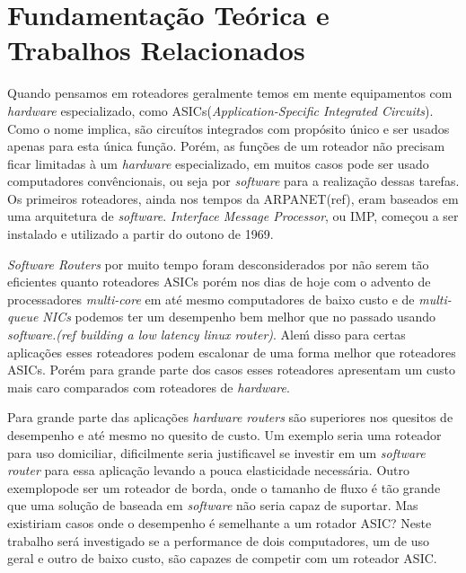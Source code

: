 \section{Fundamentação Teórica e Trabalhos Relacionados}
Quando pensamos em roteadores geralmente temos em mente equipamentos com \textit{hardware} especializado, como ASICs(\textit{Application-Specific Integrated Circuits}). Como o nome implica, são circuítos integrados com propósito único e ser usados apenas para esta única função. Porém, as funções de um roteador não precisam ficar limitadas à um \textit{hardware} especializado, em muitos casos pode ser usado computadores convêncionais, ou seja por \textit{software} para a realização dessas tarefas. 
Os primeiros roteadores, ainda nos tempos da ARPANET(ref), eram baseados em uma arquitetura de \textit{software}. \textit{Interface Message Processor}, ou IMP, começou a ser instalado e utilizado a partir do outono de 1969.%

\textit{Software Routers} por muito tempo foram desconsiderados por não serem tão eficientes quanto roteadores ASICs porém nos dias de hoje com o advento de processadores \textit{multi-core} em até mesmo computadores de baixo custo e de \textit{multi-queue NICs} podemos ter um desempenho bem melhor que no passado usando \textit{software.(ref building a low latency linux router)}. Aleḿ disso para certas aplicações esses roteadores podem escalonar de uma forma melhor que roteadores ASICs. Porém para grande parte dos casos esses roteadores apresentam um custo mais caro comparados com roteadores de \textit{hardware}.

Para grande parte das aplicações \textit{hardware routers} são superiores nos quesitos de desempenho e até mesmo no quesito de custo. Um exemplo seria uma roteador para uso domiciliar, dificilmente seria justificavel se investir em um \textit{software router} para essa aplicação levando a pouca elasticidade necessária. Outro exemplopode ser um roteador de borda, onde o tamanho de fluxo é tão grande que uma solução de baseada em \textit{software} não seria capaz de suportar. Mas existiriam casos onde o desempenho é semelhante a um rotador ASIC? Neste trabalho será investigado se a performance de dois computadores, um de uso geral e outro de baixo custo, são capazes de competir com um roteador ASIC.
